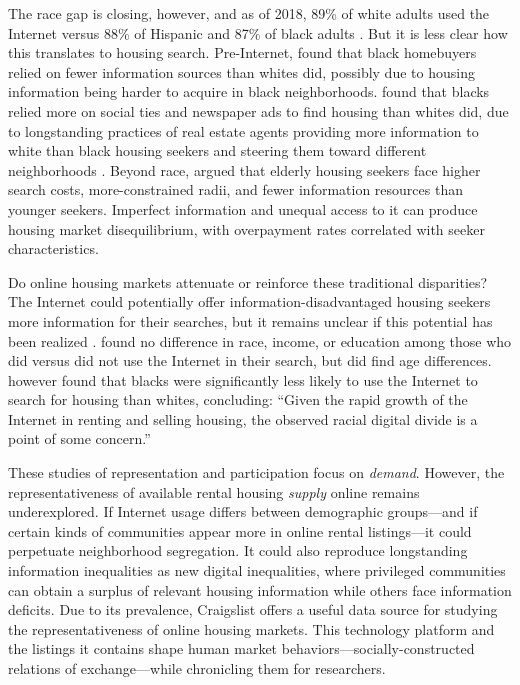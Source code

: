 \documentclass[11pt,onecolumn]{article} %
\begin{document}
The race gap is closing, however, and as of 2018, 89\% of white adults used the Internet versus 88\% of Hispanic and 87\% of black adults \citep{pew_research_center_internet_2018}. But it is less clear how this translates to housing search. Pre-Internet, \citet{newburger_sources_1995} found that black homebuyers relied on fewer information sources than whites did, possibly due to housing information being harder to acquire in black neighborhoods. \citet{farley_racial_1996} found that blacks relied more on social ties and newspaper ads to find housing than whites did, due to longstanding practices of real estate agents providing more information to white than black housing seekers and steering them toward different neighborhoods \citep[cf.][]{kwate_spatial_2013}. Beyond race, \citet{deboer_resident_1985} argued that elderly housing seekers face higher search costs, more-constrained radii, and fewer information resources than younger seekers. Imperfect information and unequal access to it can produce housing market disequilibrium, with overpayment rates correlated with seeker characteristics.

Do online housing markets attenuate or reinforce these traditional disparities? The Internet could potentially offer information-disadvantaged housing seekers more information for their searches, but it remains unclear if this potential has been realized \citep{decker_housing_2010}. \citet{palm_residential_2001} found no difference in race, income, or education among those who did versus did not use the Internet in their search, but did find age differences. \citet[][p.~598]{krysan_does_2008} however found that blacks were significantly less likely to use the Internet to search for housing than whites, concluding: \enquote{Given the rapid growth of the Internet in renting and selling housing, the observed racial digital divide is a point of some concern.}

These studies of representation and participation focus on \emph{demand}. However, the representativeness of available rental housing \emph{supply} online remains underexplored. If Internet usage differs between demographic groups---and if certain kinds of communities appear more in online rental listings---it could perpetuate neighborhood segregation. It could also reproduce longstanding information inequalities as new digital inequalities, where privileged communities can obtain a surplus of relevant housing information while others face information deficits. Due to its prevalence, Craigslist offers a useful data source for studying the representativeness of online housing markets. This technology platform and the listings it contains shape human market behaviors---socially-constructed relations of exchange---while chronicling them for researchers.
\end{document}
